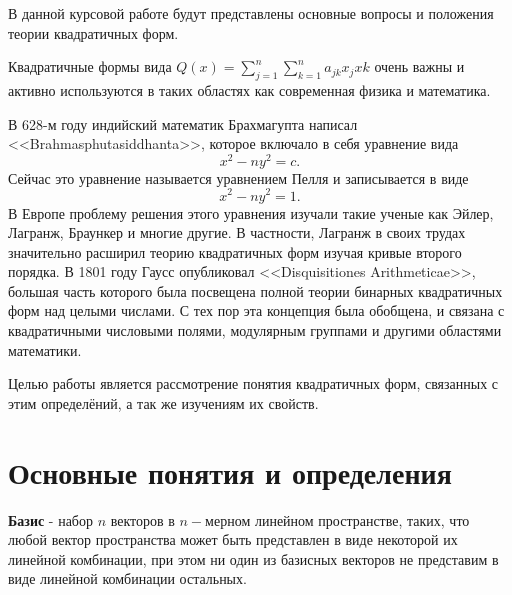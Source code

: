 \documentclass[bachelor, och, coursework, times]{SCWorks}
\author{Sharov Alex}
\newcommand{\udsum}[3]{\sum\limits_{#1}^{#2}{#3}}
\begin{document}

\patitle{} 
\paname{}
\term{} 
\practStart{}  
\practFinish{} 
\MakeTitle

\setcounter{tocdepth}{1}

\tableofcontents

\intro
В данной курсовой работе будут представлены основные вопросы и положения теории квадратичных форм.

Квадратичные формы вида $Q(x)=\udsum{j=1}{n}{}\udsum{k=1}{n}{a_{jk}x_{j}x{k}}$ очень важны и активно используются в таких областях как современная физика и математика.

В 628-м году индийский математик Брахмагупта написал \\ <<Brahmasphutasiddhanta>>, которое включало в себя уравнение вида $$x^2-ny^2=c.$$ Сейчас это уравнение называется уравнением Пелля и записывается в виде $$x^2-ny^2=1.$$ В Европе проблему решения этого уравнения изучали такие ученые как Эйлер, Лагранж, Браункер и многие другие. В частности, Лагранж в своих трудах значительно расширил теорию квадратичных форм изучая кривые второго порядка. В 1801 году Гаусс опубликовал <<Disquisitiones Arithmeticae>>, большая часть которого была посвещена  полной теории бинарных квадратичных форм над целыми числами. С тех пор эта концепция была обобщена, и связана с квадратичными числовыми полями, модулярным группами и другими областями математики.

Целью работы является рассмотрение понятия квадратичных форм, связанных с этим определёний, а так же изучениям их  свойств. 

\section{Основные понятия и определения}

\textbf{Базис} - набор $n$ векторов в $n-$мерном линейном пространстве, таких, что любой вектор пространства может быть представлен в виде некоторой их линейной комбинации, при этом ни один из базисных векторов не представим в виде линейной комбинации остальных. 
\end{document}
